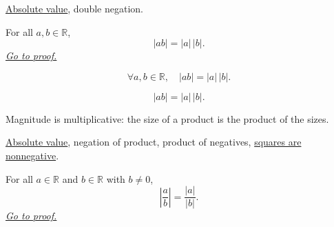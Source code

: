 \begin{dependencies}
\hyperref[def:absolute-value]{Absolute value},
double negation.
\end{dependencies}


\begin{theorem}
\label{thm:absolute-value-product}
For all $a, b \in \mathbb{R}$,
\[
  \lvert ab \rvert = \lvert a \rvert\,\lvert b \rvert.
\]
\hyperref[prf:absolute-value-product]{\textit{Go to proof.}}
\end{theorem}



\begin{remark*}
\[
  \forall a, b \in \mathbb{R},\quad
  \lvert ab \rvert = \lvert a \rvert\,\lvert b \rvert.
\]
\end{remark*}

\begin{remark*}
\[
|ab|=|a|\,|b|.
\]
\end{remark*}

\begin{remark*}[Interpretation]
Magnitude is multiplicative: the size of a product is the product of the sizes.
\end{remark*}

\begin{dependencies}
\hyperref[def:absolute-value]{Absolute value},
negation of product,
product of negatives,
\hyperref[prop:product-of-positives-is-positive-q]{squares are nonnegative}.
\end{dependencies}


\begin{theorem}
\label{thm:absolute-value-quotient}
For all $a \in \mathbb{R}$ and $b \in \mathbb{R}$ with $b \ne 0$,
\[
  \left\lvert \frac{a}{b} \right\rvert
  = \frac{\lvert a \rvert}{\lvert b \rvert}.
\]
\hyperref[prf:absolute-value-quotient]{\textit{Go to proof.}}
\end{theorem}



